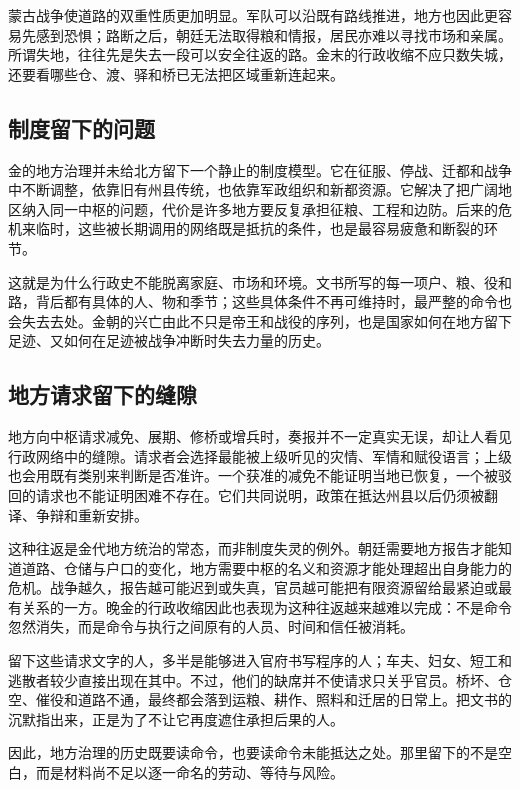 蒙古战争使道路的双重性质更加明显。军队可以沿既有路线推进，地方也因此更容易先感到恐惧；路断之后，朝廷无法取得粮和情报，居民亦难以寻找市场和亲属。所谓失地，往往先是失去一段可以安全往返的路。金末的行政收缩不应只数失城，还要看哪些仓、渡、驿和桥已无法把区域重新连起来。

\subsection{制度留下的问题}

金的地方治理并未给北方留下一个静止的制度模型。它在征服、停战、迁都和战争中不断调整，依靠旧有州县传统，也依靠军政组织和新都资源。它解决了把广阔地区纳入同一中枢的问题，代价是许多地方要反复承担征粮、工程和边防。后来的危机来临时，这些被长期调用的网络既是抵抗的条件，也是最容易疲惫和断裂的环节。

这就是为什么行政史不能脱离家庭、市场和环境。文书所写的每一项户、粮、役和路，背后都有具体的人、物和季节；这些具体条件不再可维持时，最严整的命令也会失去去处。金朝的兴亡由此不只是帝王和战役的序列，也是国家如何在地方留下足迹、又如何在足迹被战争冲断时失去力量的历史。

\subsection{地方请求留下的缝隙}

地方向中枢请求减免、展期、修桥或增兵时，奏报并不一定真实无误，却让人看见行政网络中的缝隙。请求者会选择最能被上级听见的灾情、军情和赋役语言；上级也会用既有类别来判断是否准许。一个获准的减免不能证明当地已恢复，一个被驳回的请求也不能证明困难不存在。它们共同说明，政策在抵达州县以后仍须被翻译、争辩和重新安排。

这种往返是金代地方统治的常态，而非制度失灵的例外。朝廷需要地方报告才能知道道路、仓储与户口的变化，地方需要中枢的名义和资源才能处理超出自身能力的危机。战争越久，报告越可能迟到或失真，官员越可能把有限资源留给最紧迫或最有关系的一方。晚金的行政收缩因此也表现为这种往返越来越难以完成：不是命令忽然消失，而是命令与执行之间原有的人员、时间和信任被消耗。

留下这些请求文字的人，多半是能够进入官府书写程序的人；车夫、妇女、短工和逃散者较少直接出现在其中。不过，他们的缺席并不使请求只关乎官员。桥坏、仓空、催役和道路不通，最终都会落到运粮、耕作、照料和迁居的日常上。把文书的沉默指出来，正是为了不让它再度遮住承担后果的人。

因此，地方治理的历史既要读命令，也要读命令未能抵达之处。那里留下的不是空白，而是材料尚不足以逐一命名的劳动、等待与风险。

